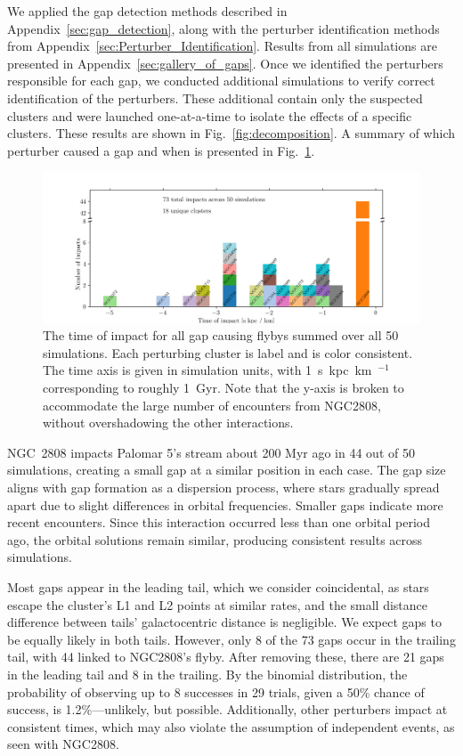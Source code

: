 \documentclass[draft]{aa}
\begin{document}
    We applied the gap detection methods described in Appendix~\ref{sec:gap_detection}, along with the perturber identification methods from Appendix~\ref{sec:Perturber_Identification}. Results from all simulations are presented in Appendix~\ref{sec:gallery_of_gaps}. Once we identified the perturbers responsible for each gap, we conducted additional simulations to verify correct identification of the perturbers. These additional contain only the suspected clusters and were launched one-at-a-time to isolate the effects of a specific clusters. These results are shown in Fig.~\ref{fig:decomposition}. A summary of which perturber caused a gap and when is presented in Fig.~\ref{fig:histogram_impact_time}. 

    \begin{figure}
      \centering
      \includegraphics[width=\linewidth]{histogram_impact_time.png}
      \caption{The time of impact for all gap causing flybys summed over all 50 simulations. Each perturbing cluster is label and is color consistent. The time axis is given in simulation units, with 1~s~kpc~km~$^{-1}$ corresponding to roughly 1~Gyr. Note that the y-axis is broken to accommodate the large number of encounters from NGC2808, without overshadowing the other interactions.}
      \label{fig:histogram_impact_time}
      \end{figure}



    NGC~2808 impacts Palomar 5's stream about 200 Myr ago in 44 out of 50 simulations, creating a small gap at a similar position in each case. The gap size aligns with gap formation as a dispersion process, where stars gradually spread apart due to slight differences in orbital frequencies. Smaller gaps indicate more recent encounters. Since this interaction occurred less than one orbital period ago, the orbital solutions remain similar, producing consistent results across simulations.


    Most gaps appear in the leading tail, which we consider coincidental, as stars escape the cluster's L1 and L2 points at similar rates, and the small distance difference between tails' galactocentric distance is negligible. We expect gaps to be equally likely in both tails. However, only 8 of the 73 gaps occur in the trailing tail, with 44 linked to NGC2808's flyby. After removing these, there are 21 gaps in the leading tail and 8 in the trailing. By the binomial distribution, the probability of observing up to 8 successes in 29 trials, given a 50\% chance of success, is 1.2\%—unlikely, but possible. Additionally, other perturbers impact at consistent times, which may also violate the assumption of independent events, as seen with NGC2808.
\end{document}
